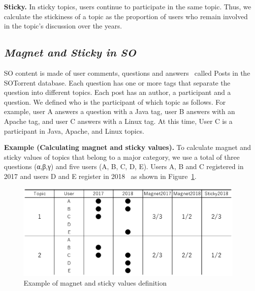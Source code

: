 \documentclass[conference]{IEEEtran}
\begin{document}
\noindent
\textbf{Sticky.} In sticky topics, users continue to participate in the same topic. Thus, we calculate the stickiness of a topic as the proportion of users who remain involved in the topic’s discussion over the years.


\subsection*{\textit{\textbf{Magnet and Sticky in SO}}}

SO content is made of user comments, questions and answers~\cite{liu2018mining} called Posts in the  SOTorrent\cite{baltes2018sotorrent} database. Each question has one or more tags that separate the question into different topics. Each post has an author, a participant and a question. We defined who is the participant of which topic as follows. For example, user A answers a question with a Java tag, user B answers with an Apache tag, and user C answers with a Linux tag. At this time, User C is a participant in Java, Apache, and Linux topics.


\noindent
\textbf{Example (Calculating magnet and sticky values).}
To calculate magnet and sticky values of topics that belong to a major category, we use a total of three questions (α,β,γ) and five users (A, B, C, D, E). Users A, B and C registered in 2017 and users D and E register in 2018~\cite{yamashita2016magnet} as shown in Figure~\ref{fig:example1}.

\begin{figure}[t]
 \centering
 \includegraphics[width=1.0\hsize]{img/fig11.eps}  
 \caption{Example of magnet and sticky values definition} 
 \label{fig:example1} 
\end{figure}
\end{document}

